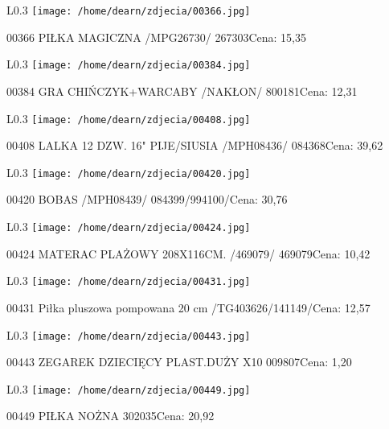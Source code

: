 \begin{wrapfigure}{L}{0.3\textwidth}
\texttt{[image: /home/dearn/zdjecia/00366.jpg]}
\end{wrapfigure}
00366 PIŁKA MAGICZNA  /MPG26730/ 267303Cena: 15,35\newline
\begin{wrapfigure}{L}{0.3\textwidth}
\texttt{[image: /home/dearn/zdjecia/00384.jpg]}
\end{wrapfigure}
00384 GRA CHIŃCZYK+WARCABY  /NAKŁON/                  800181Cena: 12,31\newline
\begin{wrapfigure}{L}{0.3\textwidth}
\texttt{[image: /home/dearn/zdjecia/00408.jpg]}
\end{wrapfigure}
00408 LALKA 12 DZW. 16" PIJE/SIUSIA /MPH08436/        084368Cena: 39,62\newline
\begin{wrapfigure}{L}{0.3\textwidth}
\texttt{[image: /home/dearn/zdjecia/00420.jpg]}
\end{wrapfigure}
00420 BOBAS /MPH08439/ 084399/994100/Cena: 30,76\newline
\begin{wrapfigure}{L}{0.3\textwidth}
\texttt{[image: /home/dearn/zdjecia/00424.jpg]}
\end{wrapfigure}
00424 MATERAC PLAŻOWY 208X116CM. /469079/             469079Cena: 10,42\newline
\begin{wrapfigure}{L}{0.3\textwidth}
\texttt{[image: /home/dearn/zdjecia/00431.jpg]}
\end{wrapfigure}
00431 Piłka pluszowa pompowana 20 cm /TG403626/141149/Cena: 12,57\newline
\begin{wrapfigure}{L}{0.3\textwidth}
\texttt{[image: /home/dearn/zdjecia/00443.jpg]}
\end{wrapfigure}
00443 ZEGAREK DZIECIĘCY PLAST.DUŻY X10                009807Cena: 1,20\newline
\begin{wrapfigure}{L}{0.3\textwidth}
\texttt{[image: /home/dearn/zdjecia/00449.jpg]}
\end{wrapfigure}
00449 PIŁKA NOŻNA 302035Cena: 20,92\newline
